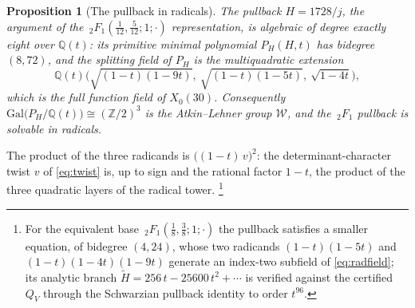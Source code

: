 \documentclass[11pt]{article}
\theoremstyle{plain}
\newtheorem{prop}[thm]{Proposition}
\theoremstyle{remark}
\begin{document}
\begin{prop}[The pullback in radicals]\label{prop:pullback}
The pullback $H=1728/j$, the argument of the
$\,_2F_1\!\left(\tfrac{1}{12},\tfrac{5}{12};1;\cdot\right)$ representation, is algebraic of degree exactly
eight over $\mathbb{Q}(t)$: its primitive minimal polynomial $P_H(H,t)$ has bidegree $(8,72)$, and the
splitting field of $P_H$ is the multiquadratic extension
\begin{equation}
\mathbb{Q}(t)\Big(\sqrt{(1-t)(1-9t)},\ \sqrt{(1-t)(1-5t)},\ \sqrt{1-4t}\Big),
\label{eq:radfield}
\end{equation}
which is the full function field of $X_0(30)$. Consequently
$\mathrm{Gal}\big(P_H/\mathbb{Q}(t)\big)\cong(\mathbb{Z}/2)^3$ is the Atkin--Lehner group $\mathcal{W}$, and
the $\,_2F_1$ pullback is solvable in radicals.
\end{prop}

The product of the three radicands is $\big((1-t)\,v\big)^2$:
the determinant-character twist $v$ of \eqref{eq:twist} is, up to sign and the rational factor $1-t$, the
product of the three quadratic layers of the radical tower.%
\footnote{For the equivalent base $\,_2F_1\!\left(\tfrac18,\tfrac38;1;\cdot\right)$ the pullback satisfies a
smaller equation, of bidegree $(4,24)$, whose two radicands $(1-t)(1-5t)$ and $(1-t)(1-4t)(1-9t)$ generate an
index-two subfield of \eqref{eq:radfield}; its analytic branch
$\widetilde H=256\,t-25600\,t^2+\cdots$ is verified against the certified $Q_V$ through the Schwarzian pullback identity to
order $t^{96}$.}
\end{document}
